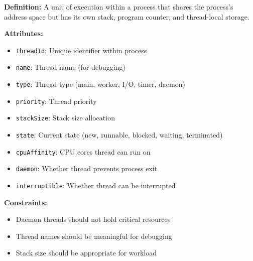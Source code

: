 \documentclass[11pt,letterpaper]{article}
\begin{document}
\begin{definitionbox}
\textbf{Definition:} A unit of execution within a process that shares the process's address space but has its own stack, program counter, and thread-local storage.

\textbf{Attributes:}
\begin{itemize}[nosep]
    \item \texttt{threadId}: Unique identifier within process
    \item \texttt{name}: Thread name (for debugging)
    \item \texttt{type}: Thread type (main, worker, I/O, timer, daemon)
    \item \texttt{priority}: Thread priority
    \item \texttt{stackSize}: Stack size allocation
    \item \texttt{state}: Current state (new, runnable, blocked, waiting, terminated)
    \item \texttt{cpuAffinity}: CPU cores thread can run on
    \item \texttt{daemon}: Whether thread prevents process exit
    \item \texttt{interruptible}: Whether thread can be interrupted
\end{itemize}

\textbf{Constraints:}
\begin{itemize}[nosep]
    \item Daemon threads should not hold critical resources
    \item Thread names should be meaningful for debugging
    \item Stack size should be appropriate for workload
\end{itemize}
\end{definitionbox}
\end{document}
